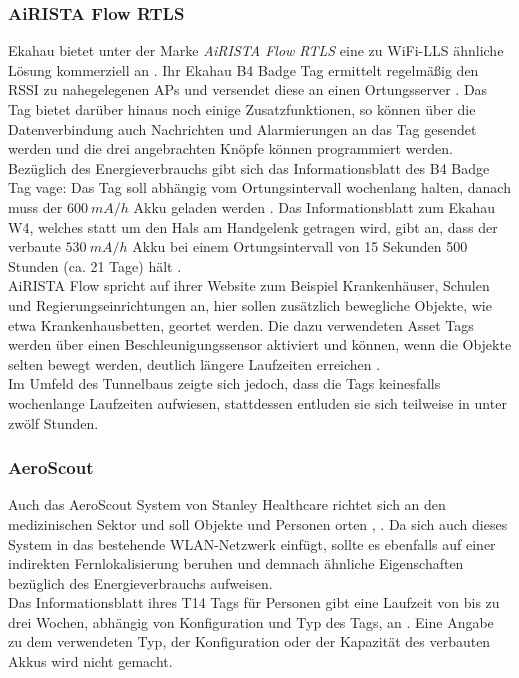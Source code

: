 \subsubsection{AiRISTA Flow RTLS}
Ekahau bietet unter der Marke \textit{AiRISTA Flow RTLS} eine zu WiFi-LLS ähnliche Lösung kommerziell an \cite{airista2017airista}.
Ihr Ekahau B4 Badge Tag ermittelt regelmäßig den RSSI zu nahegelegenen APs und versendet diese an einen Ortungsserver \cite{liu2007survey}.
Das Tag bietet darüber hinaus noch einige Zusatzfunktionen, so können über die Datenverbindung auch Nachrichten und Alarmierungen an das Tag gesendet werden und die drei angebrachten Knöpfe können programmiert werden.\\
Bezüglich des Energieverbrauchs gibt sich das Informationsblatt des B4 Badge Tag vage: Das Tag soll abhängig vom Ortungsintervall wochenlang halten, danach muss der $600\ mA/h$ Akku geladen werden \cite{ekahau2017b4}.
Das Informationsblatt zum Ekahau W4, welches statt um den Hals am Handgelenk getragen wird, gibt an, dass der verbaute $530\ mA/h$ Akku bei einem Ortungsintervall von 15 Sekunden 500 Stunden (ca. 21 Tage) hält \cite{ekahau2017w4}.\\
AiRISTA Flow spricht auf ihrer Website zum Beispiel Krankenhäuser, Schulen und Regierungseinrichtungen an, hier sollen zusätzlich bewegliche Objekte, wie etwa Krankenhausbetten, geortet werden.
Die dazu verwendeten Asset Tags werden über einen Beschleunigungssensor aktiviert und können, wenn die Objekte selten bewegt werden, deutlich längere Laufzeiten erreichen \cite{ekahau2017a4}. \\
Im Umfeld des Tunnelbaus zeigte sich jedoch, dass die Tags keinesfalls wochenlange Laufzeiten aufwiesen, stattdessen entluden sie sich teilweise in unter zwölf Stunden.

\subsubsection{AeroScout}
Auch das AeroScout System von Stanley Healthcare richtet sich an den medizinischen Sektor und soll Objekte und Personen orten \cite{aeroscout2017asset}, \cite{aeroscout2017staff}.
Da sich auch dieses System in das bestehende WLAN-Netzwerk einfügt, sollte es ebenfalls auf einer indirekten Fernlokalisierung beruhen und demnach ähnliche Eigenschaften bezüglich des Energieverbrauchs aufweisen.\\
Das Informationsblatt ihres T14 Tags für Personen gibt eine Laufzeit von bis zu drei Wochen, abhängig von Konfiguration und Typ des Tags, an \cite{aeroscout2017t14}. 
Eine Angabe zu dem verwendeten Typ, der Konfiguration oder der Kapazität des verbauten Akkus wird nicht gemacht.\\

